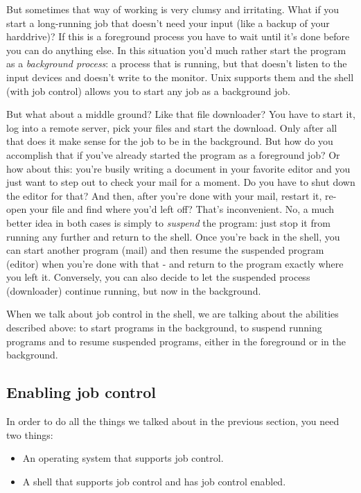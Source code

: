 But sometimes that way of working is very clumsy and irritating. What if you
start a long-running job that doesn't need your input (like a backup of your
harddrive)? If this is a foreground process you have to wait until it's done
before you can do anything else. In this situation you'd much rather start the
program as a \textit{background process}: a process that is running, but that
doesn't listen to the input devices and doesn't write to the monitor. Unix
supports them and the shell (with job control) allows you to start any job as a
background job.

But what about a middle ground? Like that file downloader? You have to start
it, log into a remote server, pick your files and start the download. Only
after all that does it make sense for the job to be in the background. But how
do you accomplish that if you've already started the program as a foreground
job? Or how about this: you're busily writing a document in your favorite
editor and you just want to step out to check your mail for a moment. Do you
have to shut down the editor for that? And then, after you're done with your
mail, restart it, re-open your file and find where you'd left off? That's
inconvenient. No, a much better idea in both cases is simply to
\textit{suspend} the program: just stop it from running any further and return
to the shell. Once you're back in the shell, you can start another program
(mail) and then resume the suspended program (editor) when you're done with
that - and return to the program exactly where you left it. Conversely, you can
also decide to let the suspended process (downloader) continue running, but now
in the background.

When we talk about job control in the shell, we are talking about the abilities
described above: to start programs in the background, to suspend running
programs and to resume suspended programs, either in the foreground or in the
background.

\subsection{Enabling job control}
In order to do all the things we talked about in the previous section, you need
two things:

\begin{itemize}
\item An operating system that supports job control.
\item A shell that supports job control and has job control enabled.
\end{itemize}

